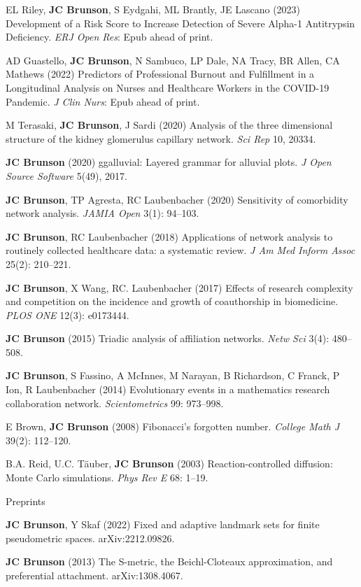 \documentclass[10pt,a4paper]{article}
\begin{document}
\begin{enumerate}[label={[\arabic*]},labelindent=1cm,nolistsep]
\item
EL Riley, {\bfseries JC Brunson}, S Eydgahi, ML Brantly, JE Lascano (2023) Development of a Risk Score to Increase Detection of Severe Alpha-1 Antitrypsin Deficiency. {\itshape ERJ Open Res}: Epub ahead of print.
\item
AD Guastello, {\bfseries JC Brunson}, N Sambuco, LP Dale, NA Tracy, BR Allen, CA Mathews (2022) Predictors of Professional Burnout and Fulfillment in a Longitudinal Analysis on Nurses and Healthcare Workers in the COVID-19 Pandemic. {\itshape J Clin Nurs}: Epub ahead of print.
\item
M Terasaki, {\bfseries JC Brunson}, J Sardi (2020) Analysis of the three dimensional structure of the kidney glomerulus capillary network. {\itshape Sci Rep} 10, 20334.
\item
{\bfseries JC Brunson} (2020) ggalluvial: Layered grammar for alluvial plots. {\itshape J Open Source Software} 5(49), 2017.
\item
{\bfseries JC Brunson}, TP Agresta, RC Laubenbacher (2020) Sensitivity of comorbidity network analysis. {\itshape JAMIA Open} 3(1): 94--103.
\item
{\bfseries JC Brunson}, RC Laubenbacher (2018) Applications of network analysis to routinely collected healthcare data: a systematic review. {\itshape J Am Med Inform Assoc} 25(2): 210--221.
\item
{\bfseries JC Brunson}, X Wang, RC. Laubenbacher (2017) Effects of research complexity and competition on the incidence and growth of coauthorship in biomedicine. {\itshape PLOS ONE} 12(3): e0173444.
\item
{\bfseries JC Brunson} (2015) Triadic analysis of affiliation networks. {\itshape Netw Sci} 3(4): 480--508.
\item
{\bfseries JC Brunson}, S Fassino, A McInnes, M Narayan, B Richardson, C Franck, P Ion, R Laubenbacher (2014) Evolutionary events in a mathematics research collaboration network. {\itshape Scientometrics} 99: 973--998.
\item
E Brown, {\bfseries JC Brunson} (2008) Fibonacci's forgotten number. {\itshape College Math J} 39(2): 112--120.
\item
B.A. Reid, U.C. T\"{a}uber, {\bfseries JC Brunson} (2003) Reaction-controlled diffusion: Monte Carlo simulations. {\itshape Phys Rev E} 68: 1--19.
\setcounter{paper}{\value{enumi}}
\end{enumerate}
%
\vspace{.25cm}
{\sc Preprints}
\begin{enumerate}[label={[\arabic*]},labelindent=1cm,nolistsep]
\setcounter{enumi}{\value{paper}}
\item
{\bfseries JC Brunson}, Y Skaf (2022) Fixed and adaptive landmark sets for finite pseudometric spaces. arXiv:2212.09826.
\item
{\bfseries JC Brunson} (2013) The S-metric, the Beichl-Cloteaux approximation, and preferential attachment. arXiv:1308.4067.
\setcounter{paper}{\value{enumi}}
\end{enumerate}
\end{document}
